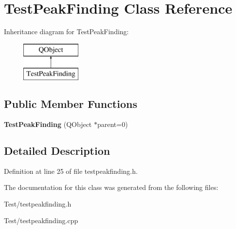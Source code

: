\hypertarget{class_test_peak_finding}{}\section{Test\+Peak\+Finding Class Reference}
\label{class_test_peak_finding}
Inheritance diagram for Test\+Peak\+Finding\+:\begin{figure}[H]
\begin{center}
\leavevmode
\includegraphics[height=2.000000cm]{class_test_peak_finding}
\end{center}
\end{figure}
\subsection*{Public Member Functions}
\begin{DoxyCompactItemize}
\item 
{\bfseries Test\+Peak\+Finding} (Q\+Object $\ast$parent=0)\hypertarget{class_test_peak_finding_af7af0153a55f1abcfda5bddd85d8f5e7}{}\label{class_test_peak_finding_af7af0153a55f1abcfda5bddd85d8f5e7}

\end{DoxyCompactItemize}


\subsection{Detailed Description}


Definition at line 25 of file testpeakfinding.\+h.



The documentation for this class was generated from the following files\+:\begin{DoxyCompactItemize}
\item 
Test/testpeakfinding.\+h\item 
Test/testpeakfinding.\+cpp\end{DoxyCompactItemize}
